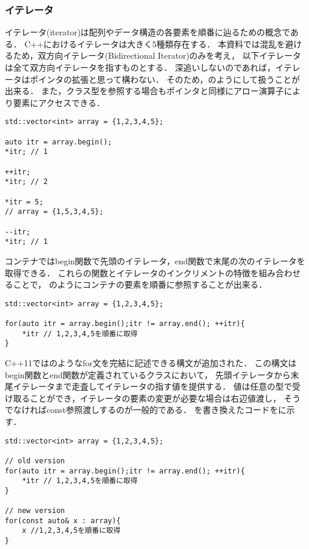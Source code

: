 \subsubsection{イテレータ}
イテレータ(iterator)は配列やデータ構造の各要素を順番に辿るための概念である．
C++におけるイテレータは大きく5種類存在する．
本資料では混乱を避けるため，双方向イテレータ(Bidirectional Iterator)のみを考え，
以下イテレータは全て双方向イテレータを指すものとする．
深追いしないのであれば，イテレータはポインタの拡張と思って構わない．
そのため，のようにして扱うことが出来る．
また，クラス型を参照する場合もポインタと同様にアロー演算子により要素にアクセスできる．
\begin{lstlisting}[label=cd:iterator_use, caption=How to use iterator]
std::vector<int> array = {1,2,3,4,5};

auto itr = array.begin();
*itr; // 1

++itr;
*itr; // 2

*itr = 5;
// array = {1,5,3,4,5};

--itr;
*itr; // 1
\end{lstlisting}

コンテナではbegin関数で先頭のイテレータ，end関数で末尾の次のイテレータを取得できる．
これらの関数とイテレータのインクリメントの特徴を組み合わせることで，
のようにコンテナの要素を順番に参照することが出来る．
\begin{lstlisting}[label=cd:iterator_for, caption=iterator on for method]
std::vector<int> array = {1,2,3,4,5};

for(auto itr = array.begin();itr != array.end(); ++itr){
    *itr // 1,2,3,4,5を順番に取得
}
\end{lstlisting}

C++11ではのようなfor文を完結に記述できる構文が追加された．
この構文はbegin関数とend関数が定義されているクラスにおいて，
先頭イテレータから末尾イテレータまで走査してイテレータの指す値を提供する．
値は任意の型で受け取ることができ，イテレータの要素の変更が必要な場合は右辺値渡し，
そうでなければconst参照渡しするのが一般的である．
を書き換えたコードをに示す．
\begin{lstlisting}[label=cd:iterator_foreach, caption=iterator on foreach method]
std::vector<int> array = {1,2,3,4,5};

// old version
for(auto itr = array.begin();itr != array.end(); ++itr){
    *itr // 1,2,3,4,5を順番に取得
}

// new version
for(const auto& x : array){
    x //1,2,3,4,5を順番に取得
}
\end{lstlisting}
